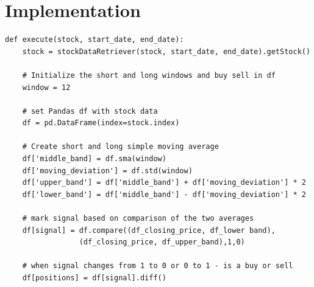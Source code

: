 \documentclass[letterpaper,11pt]{article}
\begin{document}
\section*{Implementation}
\begin{verbatim}
def execute(stock, start_date, end_date):
    stock = stockDataRetriever(stock, start_date, end_date).getStock()

    # Initialize the short and long windows and buy sell in df
    window = 12

    # set Pandas df with stock data
    df = pd.DataFrame(index=stock.index)

    # Create short and long simple moving average
    df['middle_band] = df.sma(window)
    df['moving_deviation'] = df.std(window)
    df['upper_band'] = df['middle_band'] + df['moving_deviation'] * 2
    df['lower_band'] = df['middle_band'] - df['moving_deviation'] * 2

    # mark signal based on comparison of the two averages
    df[signal] = df.compare((df_closing_price, df_lower band), 
    		     (df_closing_price, df_upper_band),1,0)

    # when signal changes from 1 to 0 or 0 to 1 - is a buy or sell
    df[positions] = df[signal].diff()

\end{verbatim}



\end{document}
